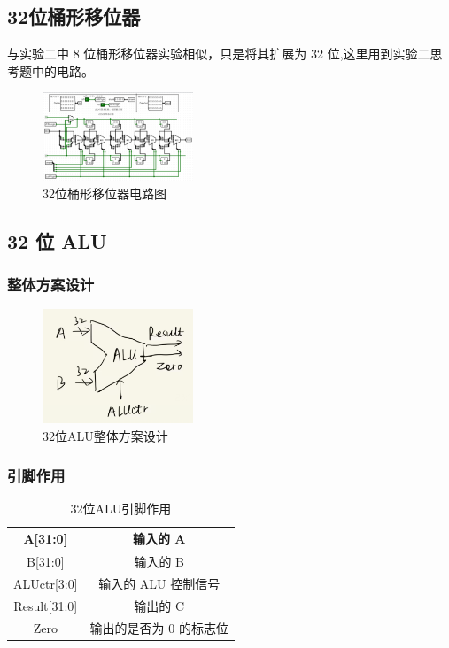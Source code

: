 \documentclass{article}
\begin{document}
    \subsection{32位桶形移位器}
    与实验二中 8 位桶形移位器实验相似，只是将其扩展为 32 位,这里用到实验二思考题中的电路。
    \begin{figure}[H]
    \centering
    \includegraphics[width=0.4\textwidth]{6.1.png}
    \caption{32位桶形移位器电路图}
    \end{figure}

    \subsection{32 位 ALU}

    \subsubsection{整体方案设计}
    \begin{figure}[H]
    \centering
    \includegraphics[width=0.4\textwidth]{6.2.png}
    \caption{32位ALU整体方案设计}
    \end{figure}

    \subsubsection{引脚作用}
    \begin{table}[H]
    \centering
    \begin{tabular}{|c|c|}
        \hline
        A[31:0]   & 输入的 A \\ \hline
        B[31:0] & 输入的 B \\ \hline
        ALUctr[3:0]   & 输入的 ALU 控制信号 \\ \hline
        Result[31:0]  & 输出的 C \\ \hline
        Zero  & 输出的是否为 0 的标志位 \\ \hline
    \end{tabular}
    \caption{32位ALU引脚作用}
    \end{table}
\end{document}
